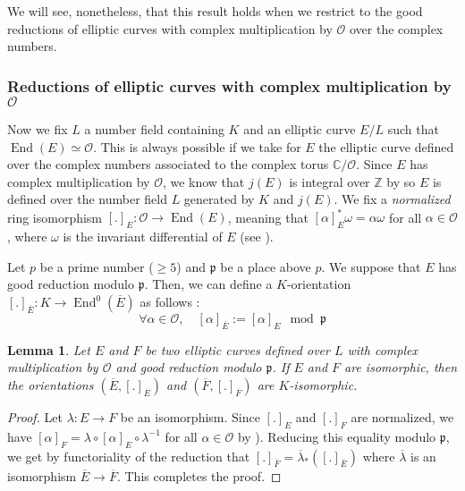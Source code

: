 \documentclass[a4paper,10pt]{report}
\theoremstyle{definition}
\theoremstyle{plain}
\newtheorem{lemma}[definition]{Lemma}
\theoremstyle{definition}
\newcommand{\Z}{\mathbb{Z}}
\newcommand{\C}{\mathbb{C}}
\newcommand{\mO}{\mathcal{O}}
\renewcommand{\(}{\left(}
\renewcommand{\)}{\right)}
\newcommand{\mfp}{\mathfrak{p}}
\DeclareMathOperator{\End}{End}
\begin{document}
We will see,  nonetheless,  that this result holds when we restrict to the good reductions of elliptic curves with complex multiplication by $\mO$ over the complex numbers. 

\subsubsection{Reductions of elliptic curves with complex multiplication by $\mO$}

Now we fix $L$ a number field containing $K$ and an elliptic curve $E/L$ such that $\End(E)\simeq \mO$. This is always possible if we take for $E$ the elliptic curve defined over the complex numbers associated to the complex torus $\C/\mO$.  Since $E$ has complex multiplication by $\mO$,  we know that $j(E)$ is integral over $\Z$ by \cite[theorem II.6.1]{Silverman2} so $E$ is defined over the number field $L$ generated by $K$ and $j(E)$.  We fix a \emph{normalized} ring isomorphism $[.]_E:\mO\longrightarrow \End(E)$,  meaning that $[\alpha]_E^*\omega=\alpha\omega$ for all $\alpha\in\mO$,  where $\omega$ is the invariant differential of $E$ (see \cite[proposition II.1.1]{Silverman2}). 

Let $p$ be a prime number ($\geq 5$) and $\mfp$ be a place above $p$.  We suppose that $E$ has good reduction modulo $\mfp$. Then, we can define a $K$-orientation $[.]_{\overline{E}}: K\longrightarrow \End^0(\overline{E})$ as follows :
\[\forall \alpha\in \mO, \quad [\alpha]_{\overline{E}}:=[\alpha]_E \mod \mfp\]

\begin{lemma}
Let $E$ and $F$ be two elliptic curves defined over $L$ with complex multiplication by $\mO$ and good reduction modulo $\mfp$.  If $E$ and $F$ are isomorphic,  then the orientations $(\overline{E},[.]_{\overline{E}})$ and $(\overline{F},[.]_{\overline{F}})$ are $K$-isomorphic.
\end{lemma}

\begin{proof}
Let $\lambda : E\longrightarrow F$ be an isomorphism.  Since $[.]_E$ and $[.]_F$ are normalized, we have  $[\alpha]_F=\lambda\circ[\alpha]_E\circ\lambda^{-1}$ for all $\alpha\in\mO$ by \cite[corollary II.1.1.1]{Silverman2}).  Reducing this equality modulo $\mfp$, we get by functoriality of the reduction that $[.]_{\overline{F}}=\overline{\lambda}_*([.]_{\overline{E}})$ where $\overline{\lambda}$ is an isomorphism $\overline{E}\longrightarrow\overline{F}$.  This completes the proof.
\end{proof}
\end{document}
